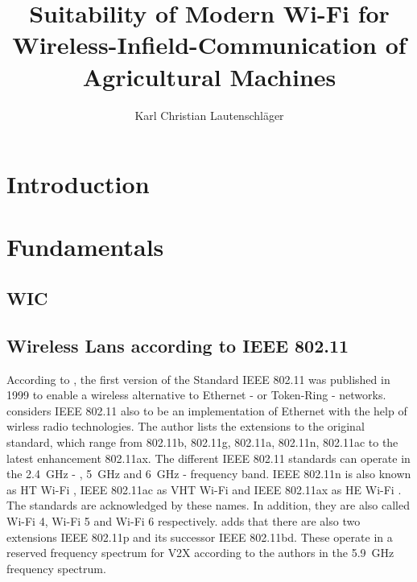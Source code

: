 \documentclass[]{nsm-thesis}
\author{Karl Christian Lautenschläger}
\title{Suitability of Modern Wi-Fi for Wireless-Infield-Communication of Agricultural Machines}
\begin{document}

\maketitle

\cleardoublepage





\tableofcontents

\cleardoublepage
{}


\chapter{Introduction}
\label{sec:introduction}


\chapter{Fundamentals}
\label{sec:fundamentals}


\section{\acl{WIC}}





\section{Wireless Lans according to IEEE 802.11}


According to \textcite[41]{kauffels_wireless_2002}, the first version of the Standard IEEE 802.11 was published in 1999 to enable a wireless alternative to Ethernet - or Token-Ring - networks.
\textcite[265-268]{sauter_wireless_2022} considers IEEE 802.11 also to be an implementation of Ethernet with the help of wirless radio technologies.
The author lists the extensions to the original standard, which range from 802.11b, 802.11g, 802.11a, 802.11n, 802.11ac to the latest enhancement 802.11ax. The different IEEE 802.11 standards can operate in the  \SI{2.4}{\giga\hertz} - , \SI{5}{\giga\hertz} and \SI{6}{\giga\hertz} - frequency band.
IEEE 802.11n is also known as \ac{HT} Wi-Fi \cite{ieee_standard_2009n}, IEEE 802.11ac as \ac{VHT} Wi-Fi \cite{ieee_standard_2020} and IEEE 802.11ax as \ac{HE} Wi-Fi \cite{ieee_standard_2021ax}.
The standards are acknowledged by these names.
In addition, they are also called Wi-Fi 4, Wi-Fi 5 and Wi-Fi 6 respectively.
\textcite{jacob_system-level_2020} adds that there are also two extensions IEEE 802.11p and its successor IEEE 802.11bd. These operate in a reserved frequency spectrum for \ac{V2X} according to the authors in the \SI{5.9}{\giga\hertz} frequency spectrum.
\end{document}
